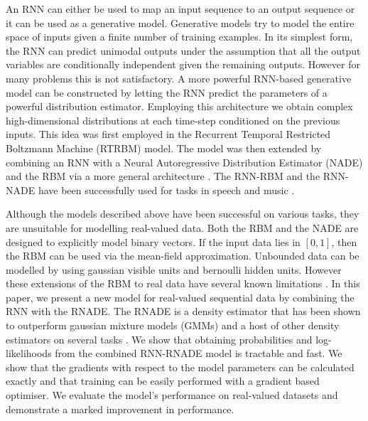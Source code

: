 \documentclass{article} %
\begin{document}
An RNN can either be used to map an input sequence to an output sequence or it can be used as a generative model. Generative models try to model the entire space of inputs given a finite number of training examples. In its simplest form, the RNN can predict unimodal outputs under the assumption that all the output variables are conditionally independent given the remaining outputs. However for many problems this is not satisfactory. A more powerful RNN-based generative model can be constructed by letting the RNN predict the parameters of a powerful distribution estimator. Employing this architecture we obtain complex high-dimensional distributions at each time-step conditioned on the previous inputs. This idea was first employed in the Recurrent Temporal Restricted Boltzmann Machine (RTRBM) \cite{Sutskever2008} model. The model was then extended by combining an RNN with a Neural Autoregressive Distribution Estimator (NADE) and the RBM via a more general architecture \cite{Boulanger-Lewandowski2012}. The RNN-RBM and the RNN-NADE have been successfully used for tasks in speech and music \cite{boulangerphone,Boulanger-Lewandowski2012}. 

Although the models described above have been successful on various tasks, they are unsuitable for modelling real-valued data. Both the RBM and the NADE are designed to explicitly model binary vectors. If the input data lies in $[0,1]$, then the RBM can be used via the mean-field approximation. Unbounded data can be modelled by using gaussian visible units and bernoulli hidden units. However these extensions of the RBM to real data have several known limitations \cite{theis2011all}. In this paper, we present a new model for real-valued sequential data by combining the RNN with the RNADE. The RNADE is a density estimator that has been shown to outperform gaussian mixture models (GMMs) and a host of other density estimators on several tasks \cite{Uria2013}. We show that obtaining probabilities and log-likelihoods from the combined RNN-RNADE model is tractable and fast. We show that the gradients with respect to the model parameters can be calculated exactly and that training can be easily performed with a gradient based optimiser. We evaluate the model's performance on real-valued datasets and demonstrate a marked improvement in performance. 
\end{document}

